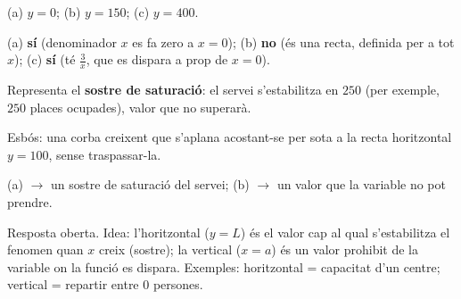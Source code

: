 \begin{solucions}
\begin{sollist}
  \item (a) $y=0$; \quad (b) $y=150$; \quad (c) $y=400$.
  \item (a) \textbf{sí} (denominador $x$ es fa zero a $x=0$); \quad (b) \textbf{no} (és
        una recta, definida per a tot $x$); \quad (c) \textbf{sí} (té $\frac{3}{x}$,
        que es dispara a prop de $x=0$).
  \item Representa el \textbf{sostre de saturació}: el servei s'estabilitza en $250$
        (per exemple, $250$ places ocupades), valor que no superarà.
  \item Esbós: una corba creixent que s'aplana acostant-se per sota a la recta
        horitzontal $y=100$, sense traspassar-la.
  \item (a) $\rightarrow$ un sostre de saturació del servei; \quad
        (b) $\rightarrow$ un valor que la variable no pot prendre.
  \item Resposta oberta. Idea: l'horitzontal ($y=L$) és el valor cap al qual
        s'estabilitza el fenomen quan $x$ creix (sostre); la vertical ($x=a$) és un
        valor prohibit de la variable on la funció es dispara. Exemples: horitzontal =
        capacitat d'un centre; vertical = repartir entre $0$ persones.
\end{sollist}
\end{solucions}
